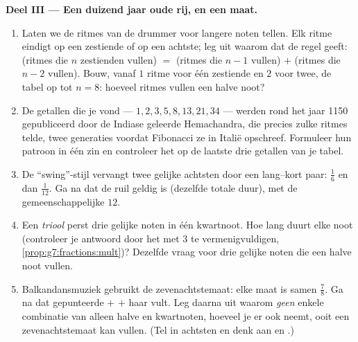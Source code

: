 \begin{problem}
\medskip
\noindent\textbf{Deel III --- Een duizend jaar oude rij, en een  maat.}
\begin{enumerate}[resume]
  \item Laten we de ritmes van de drummer voor langere noten tellen. Elk ritme
        eindigt op een zestiende of op een achtste; leg uit waarom dat de regel
        geeft: (ritmes die $n$ zestienden vullen) $=$ (ritmes die $n - 1$ vullen)
        $+$ (ritmes die $n - 2$ vullen). Bouw, vanaf $1$ ritme voor één zestiende
        en $2$ voor twee, de tabel op tot $n = 8$: hoeveel ritmes vullen een halve
        noot?
  \item De getallen die je vond --- $1, 2, 3, 5, 8, 13, 21, 34$ --- werden rond
        het jaar 1150 gepubliceerd door de Indiase geleerde Hemachandra, die
        precies zulke ritmes telde, twee generaties voordat Fibonacci ze in Italië
        opschreef. Formuleer hun patroon in één zin en controleer het op de laatste
        drie getallen van je tabel.
  \item De ``swing''-stijl vervangt twee gelijke achtsten door een lang--kort
        paar: $\frac16$ en dan $\frac{1}{12}$. Ga na dat de ruil geldig is
        (dezelfde totale duur), met de gemeenschappelijke  $12$.
  \item Een \emph{triool} perst drie gelijke noten in één kwartnoot. Hoe lang
        duurt elke noot (controleer je antwoord door het met $3$ te
        vermenigvuldigen, \cref{prop:g7:fractions:mult})? Dezelfde vraag voor drie
        gelijke noten die een halve noot vullen.
  \item Balkandansmuziek gebruikt de zevenachtstemaat: elke maat is samen
        $\frac78$. Ga na dat gepunteerde  $+$  $+$  haar vult. Leg
        daarna uit waarom \emph{geen} enkele combinatie van alleen halve en
        kwartnoten, hoeveel je er ook neemt, ooit een zevenachtstemaat kan vullen.
        (Tel in achtsten en denk aan  en .)
\end{enumerate}
\end{problem}
